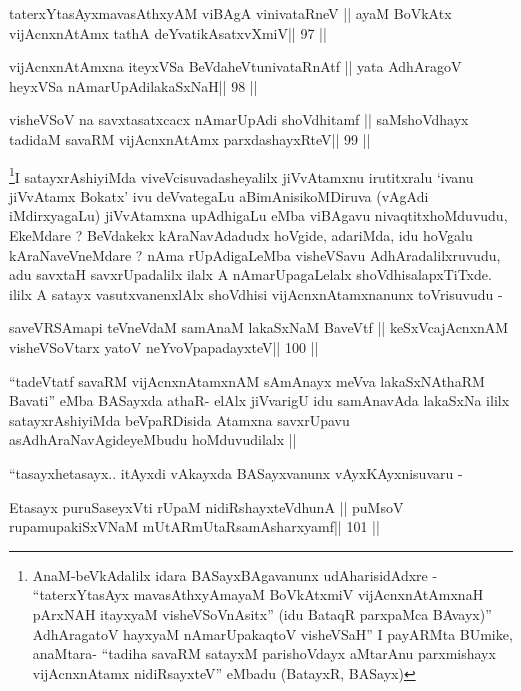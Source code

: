 \begin{shl}
taterxYtasAyxmavasAthxyAM viBAgA vinivataRneV ||
ayaM BoVkAtx vijAcnxnAtAmx tathA deYvatikAsatxvXmiV\hfill || 97 ||
\end{shl}

\begin{shl}
vijAcnxnAtAmxna iteyxVSa BeVdaheVtunivataRnAtf ||
yata AdhAragoV heyxVSa nAmarUpAdilakaSxNaH\hfill || 98 ||
\end{shl}

\begin{shl}
visheVSoV na savxtasatxcacx nAmarUpAdi shoVdhitamf ||
saMshoVdhayx tadidaM savaRM vijAcnxnAtAmx parxdashayxRteV\hfill || 99 ||
\end{shl}

\begin{artha}
\footnote[1]{AnaM-beVkAdalilx idara BASayxBAgavanunx udAharisidAdxre -
``taterxYtasAyx mavasAthxyAmayaM BoVkAtx\s miV vijAcnxnAtAmxnaH
  pArxNAH itayxyaM visheVSoVnAsitx'' (idu BataqR parxpaMca BAvayx)''
  AdhAragatoV hayxyaM nAmarUpakaqtoV visheVSaH'' I payARMta BUmike,
  anaMtara- ``tadiha savaRM satayxM parishoVdayx aMtarA\s nu
  parxmishayx vijAcnxnAtamx nidiRsayxteV'' eMbadu (BatayxR, BASayx)}I satayxrAshiyiMda viveVcisuvadasheyalilx jiVvAtamxnu
irutitxralu `ivanu jiVvAtamx Bokatx' ivu deVvategaLu
aBimAnisikoMDiruva (vAgAdi iMdirxyagaLu) jiVvAtamxna upAdhigaLu eMba
viBAgavu nivaqtitxhoMduvudu, EkeMdare ? BeVdakekx kAraNavAdadudx
hoVgide, adariMda, idu hoVgalu kAraNaveVneMdare ? nAma rUpAdigaLeMba
visheVSavu AdhAradalilxruvudu, adu savxtaH savxrUpadalilx ilalx A
nAmarUpagaLelalx shoVdhisalapxTiTxde. ililx A satayx vasutxvanenxlAlx
shoVdhisi vijAcnxnAtamxnanunx toVrisuvudu -
\end{artha}

\begin{shl}
saveVRSAmapi teVneVdaM samAnaM lakaSxNaM BaveVtf ||
keSxVcajAcnxnAM visheVSoV\s tarx yatoV neYvoVpapadayxteV\hfill || 100 ||
\end{shl}

\begin{artha}
``tadeVtatf savaRM vijAcnxnAtamxnAM sAmAnayx meVva lakaSxNAthaRM
  Bavati'' eMba BASayxda athaR- elAlx jiVvarigU idu samAnavAda
  lakaSxNa ililx satayxrAshiyiMda beVpaRDisida Atamxna savxrUpavu
  asAdhAraNavAgideyeMbudu hoMduvudilalx ||

``tasayxhe\s tasayx.. itAyxdi vAkayxda BASayxvanunx vAyxKAyxnisuvaru -
\end{artha}

\begin{shl}
Etasayx puruSaseyxVti rUpaM nidiRshayxteV\s dhunA ||
puMsoV rupamupakiSxVNaM mUtARmUtaRsamAsharxyamf\hfill || 101 ||
\end{shl}

